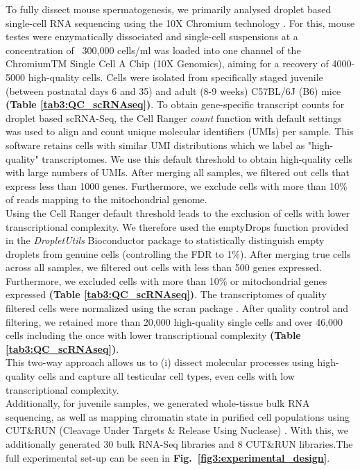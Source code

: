To fully dissect mouse spermatogenesis, we primarily analysed droplet based single-cell RNA sequencing using the 10X Chromium technology \citep{Zheng2017}. For this, mouse testes were enzymatically dissociated and single-cell suspensions at a concentration of ~300,000 cells/ml was loaded into one channel of the ChromiumTM Single Cell A Chip (10X Genomics), aiming for a recovery of 4000-5000 high-quality cells. Cells were isolated from specifically staged juvenile (between postnatal days 6 and 35) and adult (8-9 weeks) C57BL/6J (B6) mice \textbf{(Table \ref{tab3:QC_scRNAseq})}. To obtain gene-specific transcript counts for droplet based scRNA-Seq, the Cell Ranger \emph{count} function with default settings was used to align and count unique molecular identifiers (UMIs) per sample. This software retains cells with similar UMI distributions \citep{Zheng2017} which we label as "high-quality" transcriptomes. We use this default threshold to obtain high-quality cells with large numbers of UMIs. After merging all samples, we filtered out cells that express less than 1000 genes. Furthermore, we exclude cells with more than 10\% of reads mapping to the mitochondrial genome. \\
Using the Cell Ranger default threshold leads to the exclusion of cells with lower transcriptional complexity. We therefore used the emptyDrops function provided in the \emph{DropletUtils} Bioconductor package \citep{Lun2018} to statistically distinguish empty droplets from genuine cells (controlling the FDR to 1\%). After merging true cells across all samples, we filtered out cells with less than 500 genes expressed. Furthermore, we excluded cells with more than 10\% or mitochondrial genes expressed \textbf{(Table \ref{tab3:QC_scRNAseq})}. The transcriptomes of quality filtered cells were normalized using the scran package \citep{Lun2016pooling}. After quality control and filtering, we retained more than 20,000 high-quality single cells and over 46,000 cells including the once with lower transcriptional complexity \textbf{(Table \ref{tab3:QC_scRNAseq})}. \\
This two-way approach allows us to (i) dissect molecular processes using high-quality cells and capture all testicular cell types, even cells with low transcriptional complexity.\\

Additionally, for juvenile samples, we generated whole-tissue bulk RNA sequencing, as well as mapping chromatin state in purified cell populations using CUT\&{}RUN (Cleavage Under Targets \& Release Using Nuclease) \citep{Skene2018}. With this, we additionally generated 30 bulk RNA-Seq libraries and 8 CUT\&{}RUN libraries.The full experimental set-up can be seen in \textbf{Fig.~\ref{fig3:experimental_design}}.

